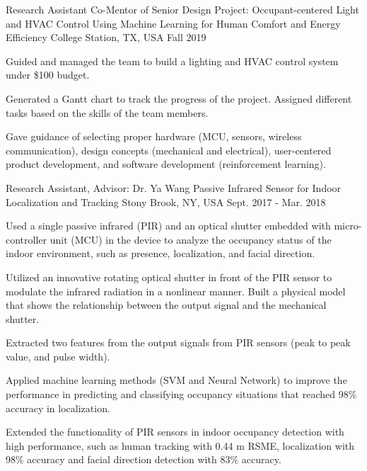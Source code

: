 \begin{cventries}
  \cventry
    {Research Assistant} %
    {Co-Mentor of Senior Design Project: Occupant-centered Light and HVAC Control Using Machine Learning for Human Comfort and Energy Efficiency} %
    {College Station, TX, USA} %
    {Fall 2019} %
    {
      \begin{cvitems} %
        \item Guided and managed the team to build a lighting and HVAC control system under \$100 budget. 
        \item Generated a Gantt chart to track the progress of the project. Assigned different tasks based on the skills of the team members.
        \item Gave guidance of selecting proper hardware (MCU, sensors, wireless communication), design concepts (mechanical and electrical), user-centered product development, and software development (reinforcement learning).
      \end{cvitems}
    }

\cventry
{Research Assistant, Advisor: Dr. Ya Wang} %
{Passive Infrared Sensor for Indoor Localization and Tracking} %
{Stony Brook, NY, USA} %
{Sept. 2017 - Mar. 2018} %
{
  \begin{cvitems} %
    \item Used a single passive infrared (PIR) and an optical shutter embedded with micro-controller unit (MCU) in the device to analyze the occupancy status of the indoor environment, such as presence, localization, and facial direction. 
    \item Utilized an innovative rotating optical shutter in front of the PIR sensor to modulate the infrared radiation in a nonlinear manner. Built a physical model that shows the relationship between the output signal and the mechanical shutter.
    \item Extracted two features from the output signals from PIR sensors (peak to peak value, and pulse width). 
    \item Applied machine learning methods (SVM and Neural Network) to improve the performance in predicting and classifying occupancy situations that reached 98\% accuracy in localization.  
    \item Extended the functionality of PIR sensors in indoor occupancy detection with high performance, such as human tracking with 0.44 m RSME, localization with 98\% accuracy and facial direction detection with 83\% accuracy. 
  \end{cvitems}
}


\end{cventries}
